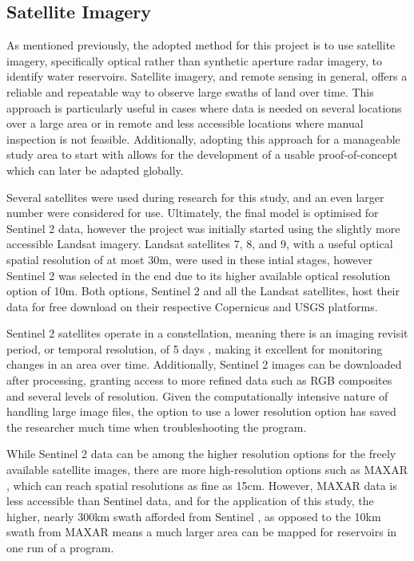 \subsection{Satellite Imagery}
As mentioned previously, the adopted method for this project is to use satellite imagery, specifically optical rather than synthetic aperture radar imagery, to identify water reservoirs. Satellite imagery, and remote sensing in general, offers a reliable and repeatable way to observe large swaths of land over time. This approach is particularly useful in cases where data is needed on several locations over a large area or in remote and less accessible locations where manual inspection is not feasible. Additionally, adopting this approach for a manageable study area to start with allows for the development of a usable proof-of-concept which can later be adapted globally. 

Several satellites were used during research for this study, and an even larger number were considered for use. Ultimately, the final model is optimised for Sentinel 2 data, however the project was initially started using the slightly more accessible Landsat imagery. Landsat satellites 7, 8, and 9, with a useful optical spatial resolution of at most 30m, were used in these intial stages, however Sentinel 2 was selected in the end due to its higher available optical resolution option of 10m. Both options, Sentinel 2 and all the Landsat satellites, host their data for free download on their respective Copernicus and USGS platforms. 

Sentinel 2 satellites operate in a constellation, meaning there is an imaging revisit period, or temporal resolution, of 5 days \citep{europeanspaceagency_2024}, making it excellent for monitoring changes in an area over time. Additionally, Sentinel 2 images can be downloaded after processing, granting access to more refined data such as RGB composites and several levels of resolution. Given the computationally intensive nature of handling large image files, the option to use a lower resolution option has saved the researcher much time when troubleshooting the program. 

While Sentinel 2 data can be among the higher resolution options for the freely available satellite images,  there are more high-resolution options such as MAXAR \citep{maxar_2021}, which can reach spatial resolutions as fine as 15cm. However, MAXAR data is less accessible than Sentinel data, and for the application of this study, the higher, nearly 300km swath afforded from Sentinel \citep{esa_2023}, as opposed to the 10km swath from MAXAR \citep{satimagingcorp_2022} means a much larger area can be mapped for reservoirs in one run of a program.  

